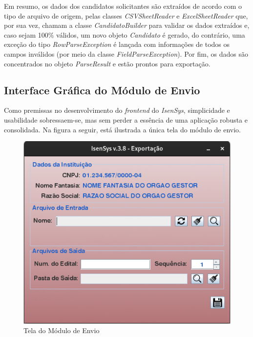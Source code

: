 \documentclass[
	12pt,			%
	openright,		%
	oneside,	
	a4paper,		%
	english,		%
	brazil			%
]{abntex2/abntex2}  %
\begin{document}
				Em resumo, os dados dos candidatos solicitantes são extraídos de acordo com o tipo de arquivo de origem, pelas classes \textit{CSVSheetReader} e \textit{ExcelSheetReader} que, por sua vez, chamam a classe \textit{CandidatoBuilder} para validar os dados extraídos e, caso sejam 100\% válidos, um novo objeto \textit{Candidato} é gerado, do contrário, uma exceção do tipo \textit{RowParseException} é lançada com informações de todos os campos inválidos (por meio da classe \textit{FieldParseException}). Por fim, os dados são concentrados no objeto \textit{ParseResult} e estão prontos para exportação.
	
			\subsection{Interface Gráfica do Módulo de Envio}
	
				Como premissas no desenvolvimento do \textit{frontend} do \textit{IsenSys}, simplicidade e usabilidade sobressaem-se, mas sem perder a essência de uma aplicação robusta e consolidada. Na figura a seguir, está ilustrada a única tela do módulo de envio.
	
				\begin{figure}[ht]
					\begin{center}
						
						\caption{Tela do Módulo de Envio}
						\includegraphics[scale=0.6]{img/envio-ui}
						
					\end{center}
				\end{figure}
	
\end{document}
